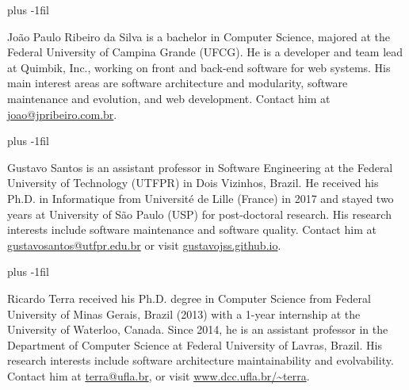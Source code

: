 \documentclass[10pt,journal,compsoc]{IEEEtran}
\begin{document}
{}\baselineskip plus -1fil

\begin{IEEEbiography}{João Paulo Ribeiro da Silva}
is a bachelor in Computer Science, majored at the Federal University of Campina Grande (UFCG). He is a developer and team lead at Quimbik, Inc., working on front and back-end software for web systems. His main interest areas are software architecture and modularity, software maintenance and evolution, and web development. Contact him at \url{joao@jpribeiro.com.br}.
\end{IEEEbiography}

\baselineskip plus -1fil

\begin{IEEEbiography}{Gustavo Santos}
is an assistant professor in Software Engineering at the Federal University of Technology (UTFPR) in Dois Vizinhos, Brazil.
He received his Ph.D. in Informatique from Université de Lille (France) in 2017 and stayed two years at University of São Paulo (USP) for post-doctoral research. 
His research interests include software maintenance and software quality. Contact him at \url{gustavosantos@utfpr.edu.br} or visit \url{gustavojss.github.io}.
\end{IEEEbiography}

\baselineskip plus -1fil

\begin{IEEEbiography}{Ricardo Terra}
received his Ph.D. degree in Computer Science from Federal University of Minas Gerais, Brazil (2013) with a 1-year internship at the University of Waterloo, Canada. 
Since 2014, he is an assistant professor in the Department of Computer Science at Federal University of Lavras, Brazil. 
His research interests include software architecture maintainability and evolvability. Contact him at \url{terra@ufla.br}, 
or visit \url{www.dcc.ufla.br/~terra}.
\end{IEEEbiography}
\end{document}
